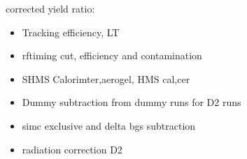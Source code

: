 \documentclass[aspectratio=169,xcolor=dvipsnames]{beamer}
\begin{document}
\begin{frame}{}
corrected yield ratio:
\begin{itemize}
    \item Tracking efficiency, LT
    \item rftiming cut, efficiency and contamination
    \item SHMS Calorimter,aerogel, HMS cal,cer
    \item Dummy subtraction from dummy runs for D2 runs
    \item simc exclusive and delta bgs subtraction
    \item radiation correction D2
\end{itemize}
\end{frame}
%
%

%
%
\end{document}
